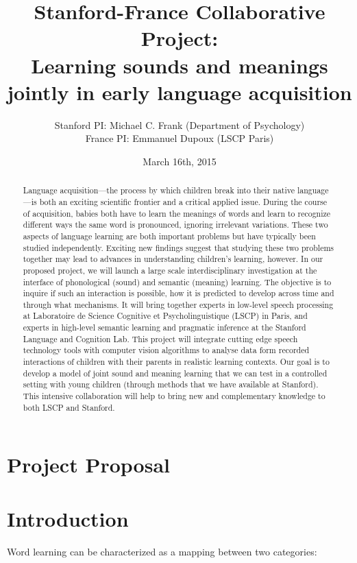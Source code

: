 \documentclass[12pt]{article}
\title{Stanford-France Collaborative Project: \\
Learning sounds and meanings jointly in early language acquisition}
\author{Stanford PI: Michael C. Frank (Department of Psychology) \\
France PI: Emmanuel Dupoux (LSCP Paris)}
\date{March 16th, 2015}
\begin{document}
\maketitle

\begin{abstract}
\noindent Language acquisition---the process by which children break into their native language---is both an exciting scientific frontier and a critical applied issue. During the course of acquisition, babies both have to learn the meanings of words and learn to recognize different ways the same word is pronounced, ignoring irrelevant variations. These two aspects of language learning are both important problems but have typically been studied independently. Exciting new findings suggest that studying these two problems together may lead to advances in understanding children's learning, however. In our proposed project, we will launch a large scale interdisciplinary investigation at the interface of phonological (sound) and semantic (meaning) learning. The objective is to inquire if such an interaction is possible, how it is predicted to develop across time and through what mechanisms. It will bring together experts in low-level speech processing at Laboratoire de Science Cognitive et Psycholinguistique (LSCP) in Paris, and experts in high-level semantic learning and pragmatic inference at the Stanford Language and Cognition Lab. This project will integrate cutting edge speech technology tools with computer vision algorithms to analyse data form recorded interactions of children with their parents in realistic learning contexts. Our goal is to develop a model of joint sound and meaning learning that we can test in a controlled setting with young children (through methods that we have available at Stanford). This intensive collaboration will help to bring new and complementary knowledge to both LSCP and Stanford.
\end{abstract}

\newpage

\section*{\centering Project Proposal}

\section*{Introduction}

Word learning can be characterized as  a mapping between two categories:
\end{document}
